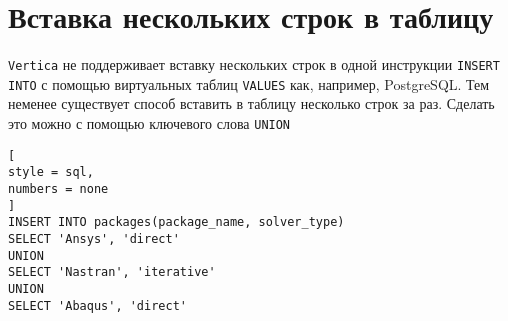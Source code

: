 \documentclass[%
	11pt,
	a4paper,
	utf8,
		]{article}
\begin{document}
\section{Вставка нескольких строк в таблицу}

\texttt{Vertica} не поддерживает вставку нескольких строк в одной инструкции \texttt{INSERT INTO} с помощью виртуальных таблиц \texttt{VALUES} как, например, PostgreSQL. Тем неменее существует способ вставить в таблицу несколько строк за раз. Сделать это можно с помощью ключевого слова \texttt{UNION}
\begin{lstlisting}[
style = sql,
numbers = none	
]
INSERT INTO packages(package_name, solver_type)
SELECT 'Ansys', 'direct'
UNION
SELECT 'Nastran', 'iterative'
UNION
SELECT 'Abaqus', 'direct'
\end{lstlisting}



\begin{thebibliography}{99}
\end{thebibliography}


\lstlistoflistings{}
\end{document}
